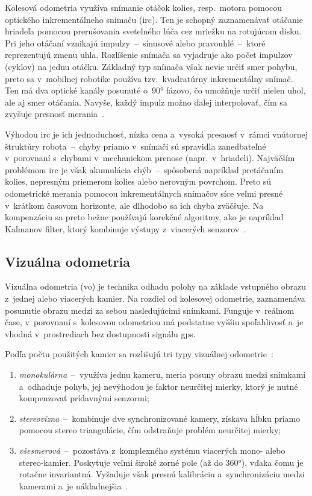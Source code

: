       Kolesová odometria využíva snímanie otáčok kolies, resp.\ motora pomocou optického inkrementálneho snímaču (\acrshort{irc}). Ten je schopný zaznamenávať otáčanie hriadeľa pomocou prerušovania svetelného lúča cez mriežku na rotujúcom disku. Pri jeho otáčaní vznikajú impulzy~--~sínusové alebo pravouhlé~--~ktoré reprezentujú zmenu uhla. Rozlíšenie snímača sa vyjadruje ako počet impulzov (cyklov) na jednu otáčku. Základný typ snímača však nevie určiť smer pohybu, preto sa v~mobilnej robotike používa tzv.\ kvadratúrny inkrementálny snímač. Ten má dva optické kanály posunuté o~90° fázovo, čo umožňuje určiť nielen uhol, ale aj smer otáčania. Navyše, každý impulz možno ďalej interpolovať, čím sa zvyšuje presnosť merania~\cite{duchonSnimaceMobilnejRobotike2012}.

      Výhodou \acrshort{irc} je ich jednoduchosť, nízka cena a~vysoká presnosť v~rámci vnútornej štruktúry robota~--~chyby priamo v~snímači sú spravidla zanedbateľné v~porovnaní s~chybami v~mechanickom prenose (napr.\ v~hriadeli). Najväčším problémom \acrshort{irc} je však akumulácia chýb~--~spôsobená napríklad pretáčaním kolies, nepresným priemerom kolies alebo nerovným povrchom. Preto sú odometrické merania pomocou inkrementálnych snímačov síce veľmi presné v~krátkom časovom horizonte, ale dlhodobo sa ich chyba zväčšuje. Na kompenzáciu sa preto bežne používajú korekčné algoritmy, ako je napríklad Kalmanov filter, ktorý kombinuje výstupy z~viacerých senzorov~\cite{duchonSnimaceMobilnejRobotike2012}.

  \subsection{Vizuálna odometria}

    Vizuálna odometria (\acrshort{vo}) je technika odhadu polohy na základe vstupného obrazu z~jednej alebo viacerých kamier. Na rozdiel od kolesovej odometrie, zaznamenáva posunutie obrazu medzi za sebou nasledujúcimi snímkami. Funguje v~reálnom čase, v~porovnaní s~kolesovou odometriou má podstatne vyššiu spoľahlivosť a~je vhodná v~prostrediach bez dostupnosti signálu \acrshort{gps}\@.

    Podľa počtu použitých kamier sa rozlišujú tri typy vizuálnej odometrie~\cite{krombachCombiningFeatureBasedDirect2017}:
    \begin{enumerate}
      \item \emph{monokulárna}~--~využíva jednu kameru, meria posuny obrazu medzi snímkami a~odhaduje pohyb, jej nevýhodou je faktor neurčitej mierky, ktorý je nutné kompenzovať prídavnými senzormi;
      \item \emph{stereovízna}~--~kombinuje dve synchronizované kamery, získava hĺbku priamo pomocou stereo triangulácie, čím odstraňuje problém neurčitej mierky;
      \item \emph{všesmerová}~--~pozostáva z~komplexného systému viacerých mono- alebo stereo-kamier. Poskytuje veľmi široké zorné pole (až do 360°), vďaka čomu je rotačne invariantná. Vyžaduje však presnú kalibráciu a~synchronizáciu medzi kamerami a~je nákladnejšia~\cite{aqelReviewVisualOdometry2016}.
    \end{enumerate}

